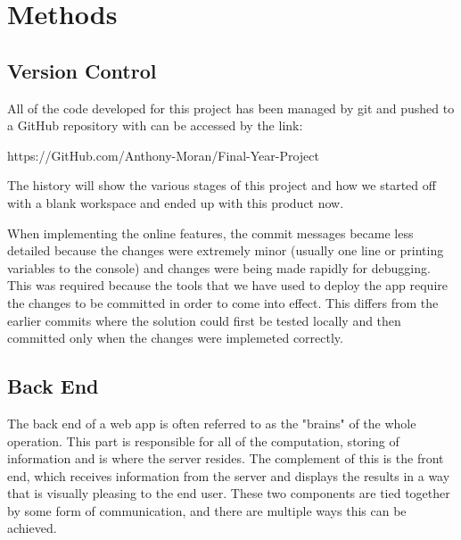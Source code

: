 \chapter{Methods}
\label{chapter2}

\section{Version Control}
\label{sec:VersionControl}
All of the code developed for this project has been managed by git and pushed to a GitHub repository with can be accessed by the link:

\begin{center}
    https://GitHub.com/Anthony-Moran/Final-Year-Project
\end{center}

The history will show the various stages of this project and how we started off with a blank workspace and ended up with this product now.

When implementing the online features, the commit messages became less detailed because the changes were extremely minor (usually one line or printing variables to the console) and changes were being made rapidly for debugging. This was required because the tools that we have used to deploy the app require the changes to be committed in order to come into effect. This differs from the earlier commits where the solution could first be tested locally and then committed only when the changes were implemeted correctly.

\section{Back End}

The back end of a web app is often referred to as the "brains" of the whole operation. This part is responsible for all of the computation, storing of information and is where the server resides. The complement of this is the front end, which receives information from the server and displays the results in a way that is visually pleasing to the end user. These two components are tied together by some form of communication, and there are multiple ways this can be achieved.

